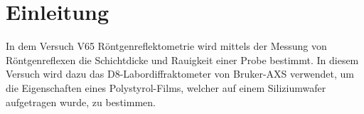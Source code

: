 

\section{Einleitung}
In dem Versuch V65 Röntgenreflektometrie wird mittels der Messung von
Röntgenreflexen die Schichtdicke und Rauigkeit einer Probe bestimmt. In diesem
Versuch wird dazu das D8-Labordiffraktometer von Bruker-AXS verwendet, um die
Eigenschaften eines Polystyrol-Films, welcher auf einem Siliziumwafer
aufgetragen wurde, zu bestimmen.~\cite{AP}
